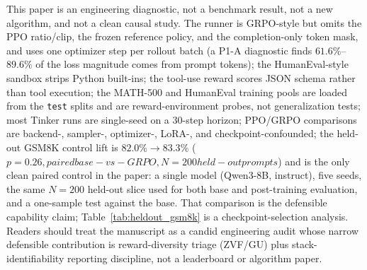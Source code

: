 This paper is an engineering diagnostic, not a benchmark result, not a new algorithm, and not a clean causal study. The runner is GRPO-style but omits the PPO ratio/clip, the frozen reference policy, and the completion-only token mask, and uses one optimizer step per rollout batch (a P1-A diagnostic finds $61.6\%$--$89.6\%$ of the loss magnitude comes from prompt tokens); the HumanEval-style sandbox strips Python built-ins; the tool-use reward scores JSON schema rather than tool execution; the MATH-500 and HumanEval training pools are loaded from the \texttt{test} splits and are reward-environment probes, not generalization tests; most Tinker runs are single-seed on a 30-step horizon; PPO/GRPO comparisons are backend-, sampler-, optimizer-, LoRA-, and checkpoint-confounded; the held-out GSM8K control lift is $82.0\%\!\to\!83.3\%$ ($p=0.26, paired base-vs-GRPO, N=200 held-out prompts $) and is the only clean paired control
in the paper: a single model (Qwen3-8B, instruct), five seeds, the same
$N{=}200$ held-out slice used for both base and post-training evaluation, and
a one-sample test against the base.  That comparison is the defensible
capability claim; Table~\ref{tab:heldout_gsm8k} is a checkpoint-selection analysis.
Readers should treat the manuscript as a candid engineering audit whose narrow defensible contribution is reward-diversity triage (ZVF/GU) plus stack-identifiability reporting discipline, not a leaderboard or algorithm paper.

